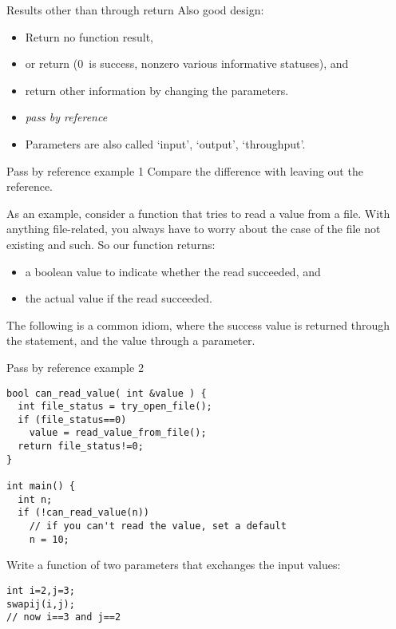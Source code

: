 \begin{slide}{Results other than through return}
  \label{sl:func-err-return}
  Also good design:
  \begin{itemize}
  \item Return no function result,
  \item or return  (0~is success, nonzero various
    informative statuses), and
  \item return other information by changing the parameters.
  \item \emph{pass by reference}
  \item Parameters are also called `input', `output', `throughput'.
  \end{itemize}
\end{slide}

\begin{block}{Pass by reference example 1}
  \label{sl:pass-reference1}
  Compare the difference with leaving out the reference.
\end{block}

As an example, consider a function that tries to read a value from a
file. With anything file-related, you always have to worry about the
case of the file not existing and such. So our function returns:
\begin{itemize}
\item a boolean value to indicate whether the read succeeded, and
\item the actual value if the read succeeded.
\end{itemize}
The following is a common idiom, where the success value is returned
through the  statement, and the value through a parameter.

\begin{block}{Pass by reference example 2}
  \label{sl:pass-reference2}
\begin{lstlisting}
bool can_read_value( int &value ) {
  int file_status = try_open_file();
  if (file_status==0) 
    value = read_value_from_file();
  return file_status!=0;
}

int main() {
  int n;
  if (!can_read_value(n))
    // if you can't read the value, set a default
    n = 10;
\end{lstlisting}
\end{block}

\begin{exercise}
  \label{ex:swap}
  Write a  function  of two parameters that
  exchanges the input values:
\begin{lstlisting}
int i=2,j=3;
swapij(i,j);
// now i==3 and j==2
\end{lstlisting}
\end{exercise}

